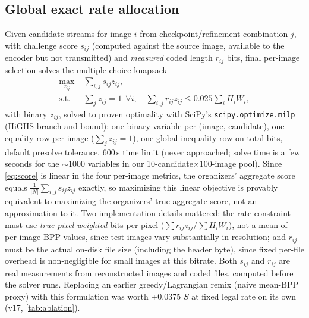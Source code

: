 \documentclass[runningheads]{llncs}
\begin{document}
\subsection{Global exact rate allocation}
\label{sec:knapsack}
Given candidate streams for image $i$ from checkpoint/refinement combination $j$, with challenge score $s_{ij}$ (computed against the source image, available to the encoder but not transmitted) and \emph{measured} coded length $r_{ij}$ bits, final per-image selection solves the multiple-choice knapsack
\begin{align}
 \max_{z_{ij}}\;&\sum_{i,j}s_{ij}z_{ij},\\
 \text{s.t. }&\sum_jz_{ij}=1\ \ \forall i,\quad
 \sum_{i,j}r_{ij}z_{ij}\leq0.025\sum_iH_iW_i,
\end{align}
with binary $z_{ij}$, solved to proven optimality with SciPy's \texttt{scipy.optimize.milp} (HiGHS branch-and-bound): one binary variable per (image, candidate), one equality row per image ($\sum_jz_{ij}=1$), one global inequality row on total bits, default presolve tolerance, 600\,s time limit (never approached; solve time is a few seconds for the $\sim\!1000$ variables in our 10-candidate$\times$100-image pool). Since \cref{eq:score} is linear in the four per-image metrics, the organizers' aggregate score equals $\frac{1}{|N|}\sum_{i,j}s_{ij}z_{ij}$ exactly, so maximizing this linear objective is provably equivalent to maximizing the organizers' true aggregate score, not an approximation to it. Two implementation details mattered: the rate constraint must use \emph{true pixel-weighted} bits-per-pixel ($\sum r_{ij}z_{ij}/\sum H_iW_i$), not a mean of per-image BPP values, since test images vary substantially in resolution; and $r_{ij}$ must be the actual on-disk file size (including the header byte), since fixed per-file overhead is non-negligible for small images at this bitrate. Both $s_{ij}$ and $r_{ij}$ are real measurements from reconstructed images and coded files, computed before the solver runs. Replacing an earlier greedy/Lagrangian remix (naive mean-BPP proxy) with this formulation was worth +0.0375 $S$ at fixed legal rate on its own (v17, \cref{tab:ablation}).
\end{document}

